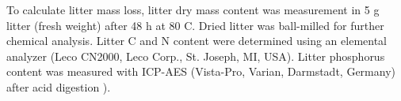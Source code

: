 \documentclass[authoryear,preprint,review,12pt]{elsarticle}
\begin{document}
                                                                                                                                                                                                                                                                                                                                                                                                                                                                                                                                                                                                                                                                                                                                                                                                                                                                                                                                                                                                                                                                                                                                                                                                                                                                                                                                                                                                                                                                                                                                        To calculate litter mass loss, litter dry mass content was measurement in 5 g litter (fresh weight) after 48 h at 80 \textdegree C. Dried litter was ball-milled for further chemical analysis. Litter C and N content were determined using an elemental analyzer (Leco CN2000, Leco Corp., St. Joseph, MI, USA). Litter phosphorus content was measured with ICP-AES (Vista-Pro, Varian, Darmstadt, Germany) after acid digestion \cite{Henschler1988}).
\end{document}
